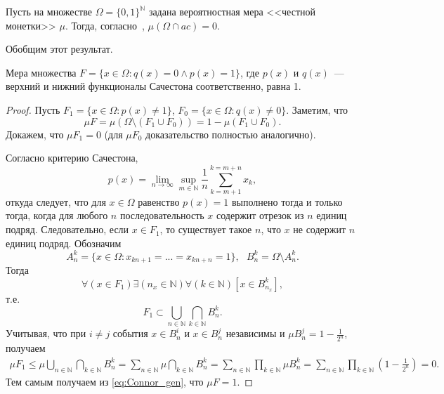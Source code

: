Пусть на множестве $\Omega=\{0,1\}^\mathbb{N}$ задана вероятностная мера <<честной монетки>> $\mu$.
Тогда, согласно~\cite{connor1990almost}, $\mu(\Omega\cap ac)=0$.

Обобщим этот результат.
\begin{theorem}
	Мера множества $F=\{x\in\Omega : q(x) = 0 \wedge p(x)= 1\}$,
	где $p(x)$ и $q(x)$~--- верхний и нижний функционалы Сачестона соответственно,
	равна 1.
\end{theorem}

\begin{proof}
	Пусть $F_1=\{x\in\Omega : p(x) \neq 1\}$, $F_0=\{x\in\Omega : q(x) \neq 0\}$.
	Заметим, что
	\begin{equation}
		\label{eq:Connor_gen}
		\mu F = \mu (\Omega\setminus(F_1 \cup F_0)) = 1 - \mu (F_1 \cup F_0)
		.
	\end{equation}
	Докажем, что $\mu F_1 = 0 $	(для $\mu F_0$  доказательство полностью аналогично).

	Согласно критерию Сачестона,
	\begin{equation}
		p(x) = \lim_{n\to\infty} \sup_{m\in\mathbb{N}} \frac{1}{n} \sum_{k=m+1}^{k=m+n} x_k
		,
	\end{equation}
	откуда следует, что
	для $x\in\Omega$ равенство $p(x) = 1$ выполнено тогда и только тогда,
	когда для любого $n$ последовательность $x$ содержит отрезок из $n$ единиц подряд.
%
	Следовательно, если $x\in F_1$,
	то существует такое $n$,
	что $x$ не содержит $n$ единиц подряд.
%
%
	Обозначим
	\begin{equation}
		A_n^k = \{x\in\Omega : x_{kn+1} = ... = x_{kn+n} = 1\}
		,
		~~~
		B_n^k = \Omega \setminus A_n^k
		.
	\end{equation}
	Тогда
	\begin{equation}
		\forall(x\in F_1)\exists(n_x\in\mathbb{N})\forall(k\in\mathbb{N})[x\in B_{n_x}^k]
		,
	\end{equation}
	т.е.
	\begin{equation}
		F_1 \subset \bigcup_{n\in\mathbb{N}} \bigcap_{k\in\mathbb{N}} B_{n}^k
		.
	\end{equation}
	Учитывая, что при $i\neq j$ события $x\in B_n^i$ и $x\in B_n^j$ независимы и $\mu B_n^j = 1-\frac{1}{2^n}$,
	получаем
	\begin{multline}
		\mu F_1 \leq \mu \bigcup_{n\in\mathbb{N}} \bigcap_{k\in\mathbb{N}} B_{n}^k
		=
		\sum_{n\in\mathbb{N}} \mu \bigcap_{k\in\mathbb{N}} B_{n}^k
		=
		\sum_{n\in\mathbb{N}}  \prod_{k\in\mathbb{N}} \mu B_{n}^k
		=
		\sum_{n\in\mathbb{N}}  \prod_{k\in\mathbb{N}} \left( 1-\frac{1}{2^n} \right)
		=0
		.
	\end{multline}
	Тем самым получаем из \eqref{eq:Connor_gen}, что $\mu F = 1$.
\end{proof}
